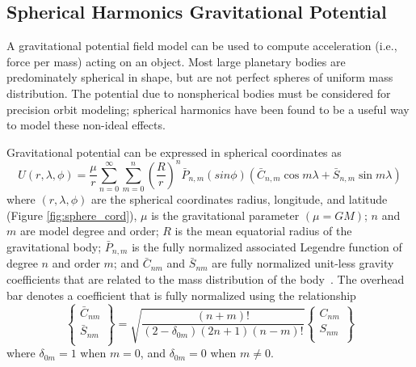 \subsection{Spherical Harmonics Gravitational Potential}
A gravitational potential field model can be used to compute acceleration
(i.e., force per mass) acting on an object.  Most large planetary bodies
are predominately spherical in shape, but are not perfect spheres of uniform
mass distribution. The potential due to nonspherical bodies must be considered
for precision orbit modeling; spherical harmonics have been found to be a useful
way to model these non-ideal effects.

Gravitational potential can be expressed in spherical coordinates
as~\cite{montenbruck2000, vallado2001}
\begin{equation}
\label{eqn:basicU}
U(r,\lambda,\phi)=\frac{\mu}{r}\sum_{n=0}^\infty\sum_{m=0}^n
\left(\frac{R}{r}\right)^n\bar{P}_{n,m}(sin\phi)(\bar{C}_{n,m}\cos
m\lambda+\bar{S}_{n,m}\sin m\lambda)
\end{equation}
where $(r,\lambda,\phi)$ are the spherical coordinates radius, 
longitude, and latitude (Figure \ref{fig:sphere_cord}),
$\mu$ is the gravitational parameter 
$(\mu=GM)$; $n$ and $m$ are model degree and order; $R$ is the 
mean equatorial radius of the gravitational body; $\bar{P}_{n,m}$ is the fully 
normalized associated Legendre function of degree $n$ and order $m$;
and $\bar{C}_{nm}$ and 
$\bar{S}_{nm}$ are fully normalized unit-less gravity coefficients 
that are related to the mass distribution of the
body~\cite{kaula1966,montenbruck2000}. The overhead bar denotes a coefficient
that is fully normalized using the relationship
\begin{equation}\label{fullynormalize}
\left\{
\begin{array}{c}
\bar{C}_{nm}\\
\bar{S}_{nm}\\
\end{array}
\right\}=\sqrt{\frac{(n+m)!}{(2-\delta_{0m})(2n+1)(n-m)!}} \left\{
\begin{array}{c}
C_{nm}\\
S_{nm}\\
\end{array}
\right\}
\end{equation}
where $\delta_{0m}=1$ when $m=0$, and $\delta_{0m}=0$ when $m\neq0$.

